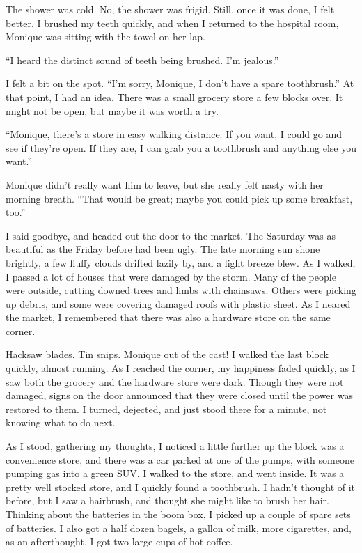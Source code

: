 The shower was cold. No, the shower was frigid. Still, once it was done, I felt better. I
brushed my teeth quickly, and when I returned to the hospital room, Monique was sitting with the
towel on her lap.

``I heard the distinct sound of teeth being brushed. I'm jealous.''

I felt a bit on the spot. ``I'm sorry, Monique, I don't have a spare toothbrush.'' At that
point, I had an idea. There was a small grocery store a few blocks over. It might not be open,
but maybe it was worth a try.

``Monique, there's a store in easy walking distance. If you want, I could go and see if
they're open. If they are, I can grab you a toothbrush and anything else you want.''

Monique didn't really want him to leave, but she really felt nasty with her morning breath.
``That would be great; maybe you could pick up some breakfast, too.''

I said goodbye, and headed out the door to the market. The Saturday was as beautiful as the
Friday before had been ugly. The late morning sun shone brightly, a few fluffy clouds drifted
lazily by, and a light breeze blew. As I walked, I passed a lot of houses that were damaged by
the storm. Many of the people were outside, cutting downed trees and limbs with chainsaws.
Others were picking up debris, and some were covering damaged roofs with plastic sheet. As I
neared the market, I remembered that there was also a hardware store on the same corner.

Hacksaw blades. Tin snips. Monique out of the cast! I walked the last block quickly, almost
running. As I reached the corner, my happiness faded quickly, as I saw both the grocery and the
hardware store were dark. Though they were not damaged, signs on the door announced that they
were closed until the power was restored to them. I turned, dejected, and just stood there for a
minute, not knowing what to do next.

As I stood, gathering my thoughts, I noticed a little further up the block was a
convenience store, and there was a car parked at one of the pumps, with someone pumping gas into
a green SUV. I walked to the store, and went inside. It was a pretty well stocked store, and I
quickly found a toothbrush. I hadn't thought of it before, but I saw a hairbrush, and thought
she might like to brush her hair. Thinking about the batteries in the boom box, I picked up a
couple of spare sets of batteries. I also got a half dozen bagels, a gallon of milk, more
cigarettes, and, as an afterthought, I got two large cups of hot coffee.

